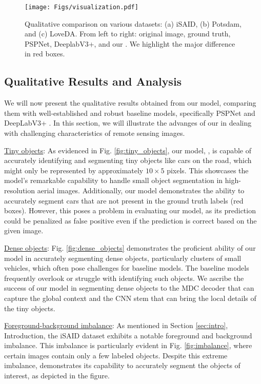 \documentclass[journal]{IEEEtran}
\begin{document}
\begin{figure*}
    \centering
    \texttt{[image: Figs/visualization.pdf]}
    \break

    \caption{Qualitative comparison on various datasets: (a) iSAID, (b) Potsdam, and (c) LoveDA. From left to right: original image, ground truth, PSPNet, DeeplabV3+, and our \model. We highlight the major difference in red boxes.}
    \label{fig:qual_all}
\end{figure*}


\subsection{Qualitative Results and Analysis}
We will now present the qualitative results obtained from our model, comparing them
with well-established and robust baseline models, specifically PSPNet \cite{zhao2017pyramid} and DeepLabV3+ \cite{chen2018encoder}. In this section, we will illustrate the advanges of our \model in dealing with challenging characteristics of remote sensing images.

\noindent
\underline{Tiny objects}: 
As evidenced in Fig. \ref{fig:tiny_objects}, our model, \model, is capable of accurately identifying and segmenting tiny objects like cars on the road, which might only be represented by approximately $10 \times 5$ pixels. This showcases the model's remarkable capability to handle small object segmentation in high-resolution aerial images. Additionally, our model demonstrates the ability to accurately segment cars that are not present in the ground truth labels (red boxes). 
However, this poses a problem in evaluating our model, as its prediction could be penalized as false positive even if the prediction is correct based on the given image. 

\noindent
\underline{Dense objects}: 
Fig. \ref{fig:dense_objects} demonstrates the proficient ability of our model in accurately segmenting dense objects, particularly clusters of small vehicles, which often pose challenges for baseline models. The baseline models frequently overlook or struggle with identifying such objects. We ascribe the success of our model in segmenting dense objects to the MDC decoder that can capture the global context and the CNN stem that can bring the local details of the tiny objects. 


\noindent
\underline{Foreground-background imbalance}: 
As mentioned in Section \ref{sec:intro}, Introduction, the iSAID dataset exhibits a notable foreground and background imbalance. This imbalance is particularly evident in Fig. \ref{fig:imbalance}, where certain images contain only a few labeled objects. Despite this extreme imbalance, \model demonstrates its capability to accurately segment the objects of interest, as depicted in the figure. 
\end{document}
